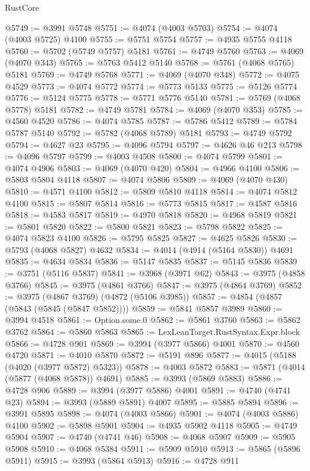 \begin{lexlean}{RustCore}
\begin{coremodule}
@5749 := @3991 @5748
@5751 := @4074 (@4003 @5703)
@5754 := @4074 (@4003 @5725) @4100
@5755 := @5751 @5754
@5757 := @4935 @5755 @4118
@5760 := @5702 (@5749 @5757) @5181
@5761 := @4749 @5760
@5763 := @4069 (@4070 @343)
@5765 := @5763 @5412 @5140
@5768 := @5761 (@4068 @5765) @5181
@5769 := @4749 @5768
@5771 := @4069 (@4070 @348)
@5772 := @4075 @4529
@5773 := @4074 @5772
@5774 := @5773 @5133
@5775 := @5126 @5774
@5776 := @5124 @5775
@5778 := @5771 @5776 @5140
@5781 := @5769 (@4068 @5778) @5181
@5782 := @4749 @5781
@5784 := @4069 (@4070 @353)
@5785 := @4560 @4520
@5786 := @4074 @5785
@5787 := @5786 @5412
@5789 := @5784 @5787 @5140
@5792 := @5782 (@4068 @5789) @5181
@5793 := @4749 @5792
@5794 := @4627 @23
@5795 := @4096 @5794
@5797 := @4626 @46 @213
@5798 := @4096 @5797
@5799 := @4003 @4508
@5800 := @4074 @5799
@5801 := @4074 @4906
@5803 := @4069 (@4070 @420)
@5804 := @4966 @4100
@5806 := @5803 @5804 @4118
@5807 := @4074 @5806
@5809 := @4069 (@4070 @430)
@5810 := @4571 @4100
@5812 := @5809 @5810 @4118
@5814 := @4074 @5812 @4100
@5815 := @5807 @5814
@5816 := @5773 @5815
@5817 := @4587 @5816
@5818 := @4583 @5817
@5819 := @4970 @5818
@5820 := @4968 @5819
@5821 := @5801 @5820
@5822 := @5800 @5821
@5823 := @5798 @5822
@5825 := @4074 @5823 @4100
@5826 := @5795 @5825
@5827 := @4625 @5826
@5830 := @5793 (@4068 @5827) @4632
@5834 := @4014 (@4914 (@5164 @5830)) @4691
@5835 := @4634 @5834
@5836 := @5147 @5835
@5837 := @5145 @5836
@5839 := @3751 (@5116 @5837)
@5841 := @3968 (@3971 @62)
@5843 := @3975 (@4858 @3766)
@5845 := @3975 (@4861 @3766)
@5847 := @3975 (@4864 @3769)
@5852 := @3975 (@4867 @3769) (@4872 (@5106 @3985))
@5857 := @4854 (@4857 (@5843 (@5845 (@5847 @5852))))
@5859 := @5841 @5857 @3989
@5860 := @3994 @4518
@5861 := Option.some.{0}
@5862 := @5861 @3760
@5863 := @5862 @3762
@5864 := @5860 @5863
@5865 := LexLeanTarget.RustSyntax.Expr.block
@5866 := @4728 @901
@5869 := @3994 (@3977 @5866) @4001
@5870 := @4560 @4720
@5871 := @4010 @5870
@5872 := @5191 @896
@5877 := @4015 (@5188 (@4020 (@3977 @5872) @5323))
@5878 := @4003 @5872
@5883 := @5871 (@4014 (@5877 (@4068 @5878)) @4691)
@5885 := @3993 (@5869 @5883)
@5886 := @4728 @906
@5889 := @3994 (@3977 @5886) @4001
@5891 := @4740 (@4741 @23)
@5894 := @3993 (@5889 @5891) @4007
@5895 := @5885 @5894
@5896 := @3991 @5895
@5898 := @4074 (@4003 @5866)
@5901 := @4074 (@4003 @5886) @4100
@5902 := @5898 @5901
@5904 := @4935 @5902 @4118
@5905 := @4749 @5904
@5907 := @4740 (@4741 @46)
@5908 := @4068 @5907
@5909 := @5905 @5908
@5910 := @4068 @5384
@5911 := @5909 @5910
@5913 := @5865 (@5896 @5911)
@5915 := @3993 (@5864 @5913)
@5916 := @4728 @911

\end{coremodule}
\end{lexlean}
